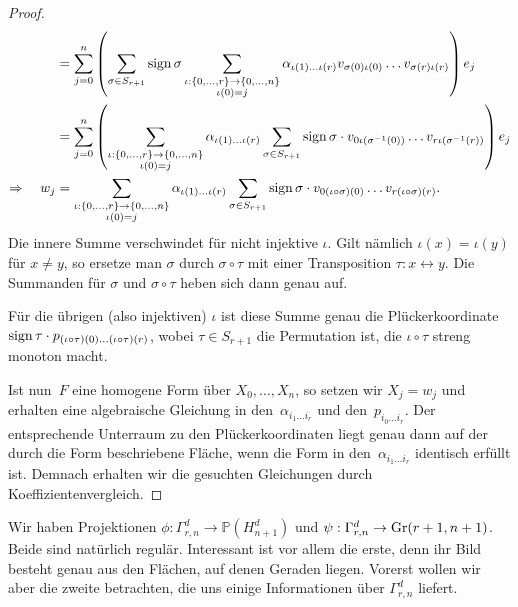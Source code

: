 \begin{proof}
\begin{align*}
	&= \sum_{j=0}^n \left(\sum\limits_{\sigma \in S_{r+1}} \operatorname{sign} \sigma \sum_{\substack{\iota: \{0, \dots, r\} \rightarrow \{0, \dots, n\} \\ \iota(0)=j }} \alpha_{\iota(1) \dots \iota(r)} v_{\sigma(0)\iota(0)} \dots v_{\sigma(r)\iota(r)}\right) e_j \\
	&= \sum_{j=0}^n \left(\sum_{\substack{\iota: \{0, \dots, r\} \rightarrow \{0, \dots, n\} \\ \iota(0)=j }} \alpha_{\iota(1) \dots \iota(r)} \sum\limits_{\sigma \in S_{r+1}} \operatorname{sign} \sigma \cdot v_{0\iota(\sigma^{-1}(0))} \dots v_{r\iota(\sigma^{-1}(r))}\right) e_j \\
\Rightarrow\quad w_j	&= \sum_{\substack{\iota: \{0, \dots, r\} \rightarrow \{0, \dots, n\} \\ \iota(0)=j }} \alpha_{\iota(1) \dots \iota(r)} \sum\limits_{\sigma \in S_{r+1}} \operatorname{sign} \sigma \cdot v_{0(\iota\circ\sigma)(0)} \dots v_{r(\iota\circ\sigma)(r)}.
\end{align*}
Die innere Summe verschwindet für nicht injektive $\iota$. Gilt nämlich $\iota(x) = \iota(y)$ für $x \neq y$, so ersetze man $\sigma$ durch $\sigma \circ \tau$ mit einer Transposition $\tau: x \leftrightarrow y$. Die Summanden für $\sigma$ und $\sigma \circ \tau$ heben sich dann genau auf.

Für die übrigen (also injektiven) $\iota$ ist diese Summe genau die Plückerkoordinate $\operatorname{sign} \tau \cdot p_{(\iota\circ\tau)(0)\dots(\iota\circ\tau)(r)}$, wobei $\tau \in S_{r+1}$ die Permutation ist, die $\iota \circ \tau$ streng monoton macht.

Ist nun~$F$ eine homogene Form über $X_0, \dots, X_n$, so setzen wir $X_j = w_j$ und erhalten eine algebraische Gleichung in den~$\alpha_{i_1 \dots i_r}$ und den~$p_{i_0 \dots i_r}$. Der entsprechende Unterraum zu den Plückerkoordinaten liegt genau dann auf der durch die Form beschriebene Fläche, wenn die Form in den~$\alpha_{i_1 \dots i_r}$ identisch erfüllt ist. Demnach erhalten wir die gesuchten Gleichungen durch Koeffizientenvergleich.
\end{proof}

Wir haben Projektionen $\phi \colon \Gamma_{r,n}^d \to \mathbb P(H_{n+1}^d)$ und $\psi: \Gamma_{r,n}^d \to \grass r+1/{n+1}$. Beide sind natürlich regulär. Interessant ist vor allem die erste, denn ihr Bild besteht genau aus den Flächen, auf denen Geraden liegen. Vorerst wollen wir aber die zweite betrachten, die uns einige Informationen über $\Gamma_{r,n}^d$ liefert.

